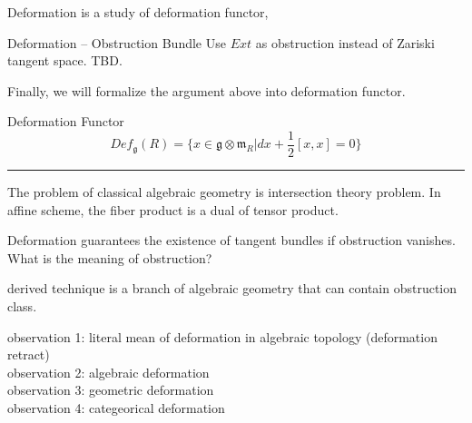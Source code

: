 \documentclass{article}
\begin{document}
Deformation is a study of deformation functor, 


\begin{example}{Deformation -- Obstruction Bundle}{}
Use $Ext$ as obstruction instead of Zariski tangent space. TBD.
\end{example}


\noindent
Finally, we will formalize the argument above into deformation functor.\\


\begin{definition}{Deformation Functor}{}
\[Def_{\mathfrak{g}}(R) = \{ x \in \mathfrak{g}\otimes \mathfrak{m}_R | dx + \frac{1}{2}[x,x] = 0\} \]
\end{definition}





\vspace{0.5cm}
\noindent\rule{\textwidth}{0.4pt}
\vspace{0.5cm}


\noindent
The problem of classical algebraic geometry is intersection theory problem.
In affine scheme, the fiber product is a dual of tensor product.

\begin{example}{}{}
\end{example}

Deformation guarantees the existence of tangent bundles if obstruction vanishes.
What is the meaning of obstruction?

derived technique is a branch of algebraic geometry that can contain obstruction class.


observation 1:
literal mean of deformation in algebraic topology (deformation retract) \\

observation 2:
algebraic deformation \\

observation 3:
geometric deformation \\

observation 4:
categeorical deformation \\
\end{document}
